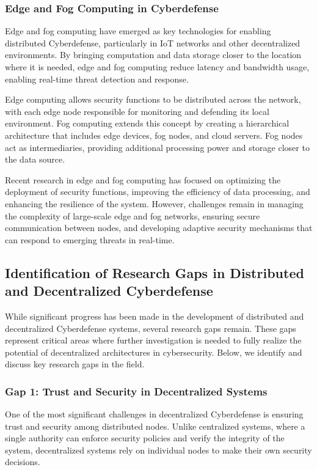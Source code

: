 \subsubsection{Edge and Fog Computing in Cyberdefense}

Edge and fog computing have emerged as key technologies for enabling distributed Cyberdefense, particularly in IoT networks and other decentralized environments. By bringing computation and data storage closer to the location where it is needed, edge and fog computing reduce latency and bandwidth usage, enabling real-time threat detection and response.

Edge computing allows security functions to be distributed across the network, with each edge node responsible for monitoring and defending its local environment. Fog computing extends this concept by creating a hierarchical architecture that includes edge devices, fog nodes, and cloud servers. Fog nodes act as intermediaries, providing additional processing power and storage closer to the data source.

Recent research in edge and fog computing has focused on optimizing the deployment of security functions, improving the efficiency of data processing, and enhancing the resilience of the system. However, challenges remain in managing the complexity of large-scale edge and fog networks, ensuring secure communication between nodes, and developing adaptive security mechanisms that can respond to emerging threats in real-time.

\subsection{Identification of Research Gaps in Distributed and Decentralized Cyberdefense}

While significant progress has been made in the development of distributed and decentralized Cyberdefense systems, several research gaps remain. These gaps represent critical areas where further investigation is needed to fully realize the potential of decentralized architectures in cybersecurity. Below, we identify and discuss key research gaps in the field.

\subsubsection{Gap 1: Trust and Security in Decentralized Systems}

One of the most significant challenges in decentralized Cyberdefense is ensuring trust and security among distributed nodes. Unlike centralized systems, where a single authority can enforce security policies and verify the integrity of the system, decentralized systems rely on individual nodes to make their own security decisions.

